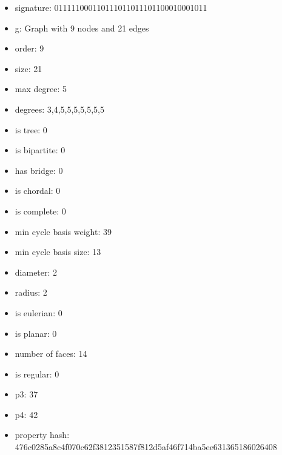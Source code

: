 \newpage
\begin{figure}
\end{figure}
\begin{itemize}
\item signature: 011111000110111011011101100010001011
\item g: Graph with 9 nodes and 21 edges
\item order: 9
\item size: 21
\item max degree: 5
\item degrees: 3,4,5,5,5,5,5,5,5
\item is tree: 0
\item is bipartite: 0
\item has bridge: 0
\item is chordal: 0
\item is complete: 0
\item min cycle basis weight: 39
\item min cycle basis size: 13
\item diameter: 2
\item radius: 2
\item is eulerian: 0
\item is planar: 0
\item number of faces: 14
\item is regular: 0
\item p3: 37
\item p4: 42
\item property hash: 476c0285a8c4f070c62f3812351587f812d5af46f714ba5ee631365186026408
\end{itemize}
